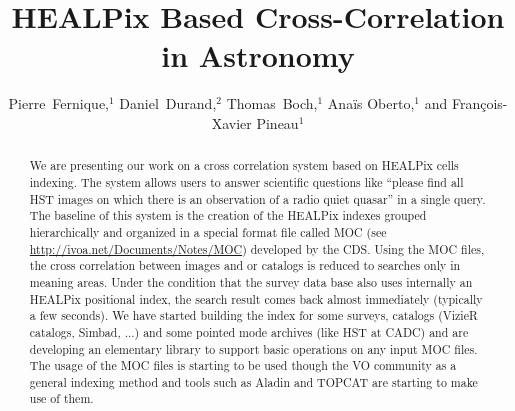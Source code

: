 
\resetcounters




\title{HEALPix Based Cross-Correlation in Astronomy}
\author{Pierre~Fernique,$^1$ Daniel~Durand,$^2$ Thomas~Boch,$^1$ Ana\"is Oberto,$^1$ and Fran\c{c}ois-Xavier Pineau$^1$
}


\begin{abstract}
We are presenting our work on a cross correlation system based on
        HEALPix cells indexing. The system allows users to answer
        scientific
        questions like ``please find all HST images on which there is an
        observation of a radio quiet quasar'' in a single query. The baseline
        of this system is the creation of the HEALPix indexes grouped
        hierarchically and organized in a special format file called MOC
        (see \url{http://ivoa.net/Documents/Notes/MOC}) developed by the CDS. Using the MOC files,
         the cross correlation between images and or catalogs is reduced to searches only in meaning areas. Under the condition that the
        survey data base also uses internally an HEALPix positional index,
        the search result comes back almost immediately (typically a few
        seconds).
        We have started building the index for some surveys, catalogs (VizieR
        catalogs, Simbad, ...) and some pointed mode archives (like HST at
        CADC) and are developing an elementary library to support basic operations
        on any input MOC files. The usage of the MOC files is starting to
        be used though the VO community as a general indexing method and
        tools such as Aladin and TOPCAT are starting to
        make use of them.

\end{abstract}

